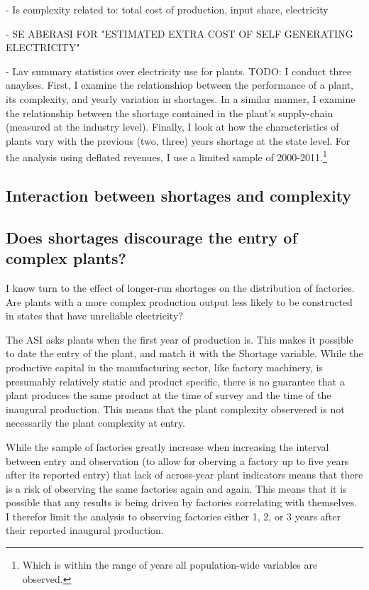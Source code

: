 \documentclass[11pt]{article}
\begin{document}
- Is complexity related to: total cost of production, input share, electricity 

- SE ABERASI FOR "ESTIMATED EXTRA COST OF SELF GENERATING ELECTRICITY"

- Lav summary statistics over electricity use for plants.
TODO: I conduct three anaylses. First, I examine the relationshiop between the performance of a plant, its complexity, and yearly variation in shortages. In a similar manner, I examine the relationship between the shortage contained in the plant's supply-chain (measured at the industry level). Finally, I look at how the characteristics of plants vary with the previous (two, three) years shortage at the state level. For the analysis using deflated revenues, I use a limited sample of 2000-2011.\footnote{Which is within the range of years all population-wide variables are observed.} 
\subsection{Interaction between shortages and complexity}%
\label{sub:regressions}


\subsection{Does shortages discourage the entry of complex plants?}%
\label{sub:longterm}

I know turn to the effect of longer-run shortages on the distribution of factories. Are plants with a more complex production output less likely to be constructed in states that have unreliable electricity? 

The ASI asks plants when the first year of production is. This makes it possible to date the entry of the plant, and match it with the Shortage variable. While the productive capital in the manufacturing sector, like factory machinery, is presumably relatively static and product specific, there is no guarantee that a plant produces the same product at the time of survey and the time of the inaugural production. This means that the plant complexity observered is not necessarily the plant complexity at entry.

While the sample of factories greatly increase when increasing the interval between entry and observation (to allow for oberving a factory up to five years after its reported entry) that lack of across-year plant indicators means that there is a risk of observing the same factories again and again. This means that it is possible that any results is being driven by factories correlating with themselves. I therefor limit the analysis to observing factories either 1, 2, or 3 years after their reported inaugural production. 
\end{document}
